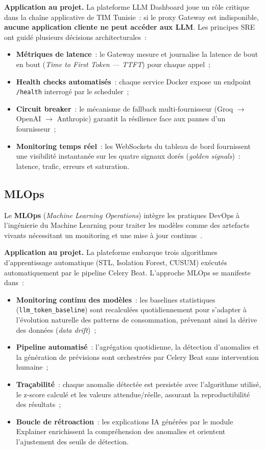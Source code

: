 \textbf{Application au projet.} La plateforme LLM Dashboard joue un rôle critique dans la chaîne applicative de TIM Tunisie~: si le proxy Gateway est indisponible, \textbf{aucune application cliente ne peut accéder aux LLM}. Les principes SRE ont guidé plusieurs décisions architecturales~:

\begin{itemize}[noitemsep]
    \item \textbf{Métriques de latence}~: le Gateway mesure et journalise la latence de bout en bout (\textit{Time to First Token --- TTFT}) pour chaque appel~;
    \item \textbf{Health checks automatisés}~: chaque service Docker expose un endpoint \texttt{/health} interrogé par le scheduler~;
    \item \textbf{Circuit breaker}~: le mécanisme de fallback multi-fournisseur (Groq $\rightarrow$ OpenAI $\rightarrow$ Anthropic) garantit la résilience face aux pannes d'un fournisseur~;
    \item \textbf{Monitoring temps réel}~: les WebSockets du tableau de bord fournissent une visibilité instantanée sur les quatre signaux dorés (\textit{golden signals})~: latence, trafic, erreurs et saturation.
\end{itemize}


\subsection{MLOps}

Le \textbf{MLOps} (\textit{Machine Learning Operations}) intègre les pratiques DevOps à l'ingénierie du Machine Learning pour traiter les modèles comme des artefacts vivants nécessitant un monitoring et une mise à jour continus~\cite{sculley2015}.

\textbf{Application au projet.} La plateforme embarque trois algorithmes d'apprentissage automatique (STL, Isolation Forest, CUSUM) exécutés automatiquement par le pipeline Celery Beat. L'approche MLOps se manifeste dans~:

\begin{itemize}[noitemsep]
    \item \textbf{Monitoring continu des modèles}~: les baselines statistiques (\texttt{llm\_token\_baseline}) sont recalculées quotidiennement pour s'adapter à l'évolution naturelle des patterns de consommation, prévenant ainsi la dérive des données (\textit{data drift})~;
    \item \textbf{Pipeline automatisé}~: l'agrégation quotidienne, la détection d'anomalies et la génération de prévisions sont orchestrées par Celery Beat sans intervention humaine~;
    \item \textbf{Traçabilité}~: chaque anomalie détectée est persistée avec l'algorithme utilisé, le z-score calculé et les valeurs attendue/réelle, assurant la reproductibilité des résultats~;
    \item \textbf{Boucle de rétroaction}~: les explications IA générées par le module Explainer enrichissent la compréhension des anomalies et orientent l'ajustement des seuils de détection.
\end{itemize}


